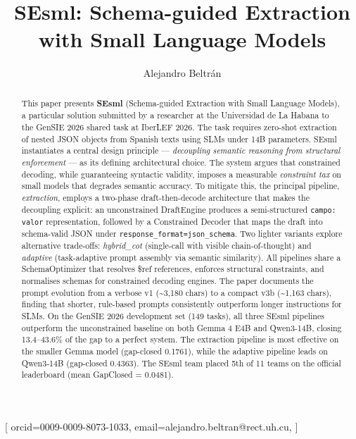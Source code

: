 \documentclass{ceurart}
\begin{document}


\title{SEsml: Schema-guided Extraction with Small Language Models}

\author[1]{Alejandro Beltr\'an}[%
  orcid=0009-0009-8073-1033,
  email=alejandro.beltran@rect.uh.cu,
]
\address[1]{Universidad de La Habana, Havana, Cuba}

\begin{abstract}
This paper presents \textbf{SEsml} (Schema-guided Extraction with Small Language Models),
a particular solution submitted by a researcher at the Universidad de La Habana
to the GenSIE 2026 shared task at IberLEF 2026.
The task requires zero-shot extraction of nested JSON objects from Spanish texts using
SLMs under 14B parameters.
SEsml instantiates a central design principle --- \emph{decoupling semantic reasoning
from structural enforcement} --- as its defining architectural choice.
The system argues that constrained decoding, while guaranteeing syntactic validity,
imposes a measurable \emph{constraint tax} on small models that degrades semantic accuracy.
To mitigate this, the principal pipeline, \emph{extraction}, employs a two-phase
draft-then-decode architecture that makes the decoupling explicit: an unconstrained
DraftEngine produces a semi-structured \texttt{campo: valor} representation, followed
by a Constrained Decoder that maps the draft into schema-valid JSON under
\texttt{response\_format=json\_schema}.
Two lighter variants explore alternative trade-offs: \emph{hybrid\_cot} (single-call with
visible chain-of-thought) and \emph{adaptive} (task-adaptive prompt assembly via semantic
similarity).
All pipelines share a SchemaOptimizer that resolves \$ref references, enforces structural
constraints, and normalises schemas for constrained decoding engines.
The paper documents the prompt evolution from a verbose v1 ({\textasciitilde}3,180 chars)
to a compact v3b ({\textasciitilde}1,163 chars), finding that shorter, rule-based prompts
consistently outperform longer instructions for SLMs.
On the GenSIE 2026 development set (149 tasks),
all three SEsml pipelines outperform the unconstrained baseline on both
Gemma 4 E4B and Qwen3-14B, closing 13.4--43.6\% of the gap to a perfect system.
The extraction pipeline is most effective on the smaller Gemma model (gap-closed 0.1761),
while the adaptive pipeline leads on Qwen3-14B (gap-closed 0.4363).
The SEsml team placed 5th of 11 teams on the official leaderboard (mean GapClosed = 0.0481).
\end{abstract}
\end{document}
